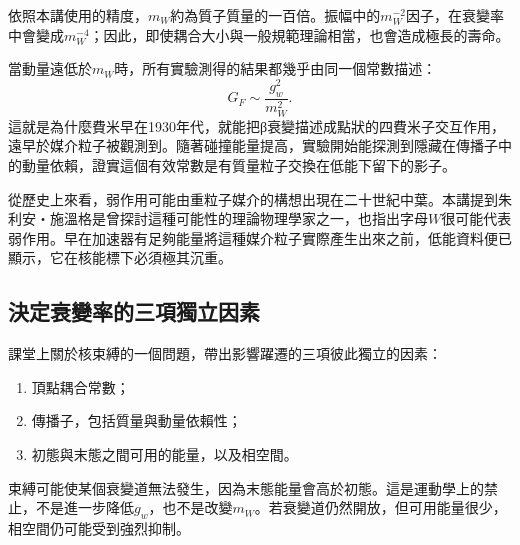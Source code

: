 依照本講使用的精度，\(m_W\)約為質子質量的一百倍。振幅中的\(m_W^{-2}\)因子，在衰變率中會變成\(m_W^{-4}\)；因此，即使耦合大小與一般規範理論相當，也會造成極長的壽命。

\begin{classroomqa}
\end{classroomqa}

當動量遠低於\(m_W\)時，所有實驗測得的結果都幾乎由同一個常數描述：
\begin{equation}
  G_F\sim\frac{g_w^2}{m_W^2}.
\end{equation}
這就是為什麼費米早在1930年代，就能把{\proseunicodefont β}衰變描述成點狀的四費米子交互作用，遠早於媒介粒子被觀測到。隨著碰撞能量提高，實驗開始能探測到隱藏在傳播子中的動量依賴，證實這個有效常數是有質量粒子交換在低能下留下的影子。

從歷史上來看，弱作用可能由重粒子媒介的構想出現在二十世紀中葉。本講提到朱利安・施溫格是曾探討這種可能性的理論物理學家之一，也指出字母\(W\)很可能代表弱作用。早在加速器有足夠能量將這種媒介粒子實際產生出來之前，低能資料便已顯示，它在核能標下必須極其沉重。

\subsection{決定衰變率的三項獨立因素}

課堂上關於核束縛的一個問題，帶出影響躍遷的三項彼此獨立的因素：
\begin{enumerate}
  \item 頂點耦合常數；
  \item 傳播子，包括質量與動量依賴性；
  \item 初態與末態之間可用的能量，以及相空間。
\end{enumerate}
束縛可能使某個衰變道無法發生，因為末態能量會高於初態。這是運動學上的禁止，不是進一步降低\(g_w\)，也不是改變\(m_W\)。若衰變道仍然開放，但可用能量很少，相空間仍可能受到強烈抑制。

